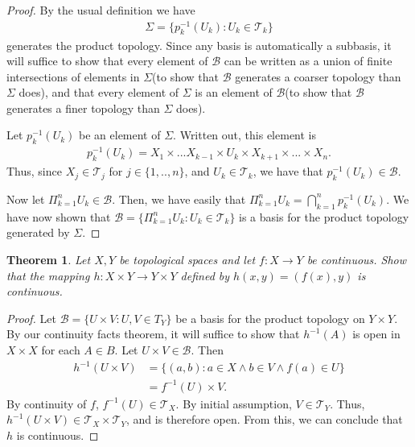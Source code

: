 \documentclass[10pt,a4paper]{article}
\theoremstyle{theorem}
\newtheorem{theorem}{Theorem}
\theoremstyle{definition}
\newcommand{\Tau}{\mathcal{T}}
\begin{document}
\begin{proof}
By the usual definition we have
\begin{align*}
\Sigma = \{p_{k}^{-1}(U_k): U_k \in \Tau_k\}
\end{align*}
generates the product topology. Since any basis is automatically a subbasis, it will suffice to show that every element of $\mathcal{B}$ can be written as a union of finite intersections of elements in $\Sigma$(to show that $\mathcal{B}$ generates a coarser topology than $\Sigma$ does),  and that every element of $\Sigma$ is an element of $\mathcal{B}$(to show that $\mathcal{B}$ generates a finer topology than $\Sigma$ does).

Let $p_{k}^{-1}(U_k)$ be an element of $\Sigma$. Written out, this element is 
\begin{align*}
p_{k}^{-1}(U_k) = X_1 \times ...  X_{k-1} \times U_k \times X_{k+1} \times ... \times X_n.
\end{align*}
Thus, since $X_j \in \Tau_j$ for $j \in \{1,..,n\}$, and $U_k \in \Tau_k$, we have that $p_{k}^{-1}(U_k) \in \mathcal{B}$.

Now let $\Pi_{k=1}^{n} U_k \in \mathcal{B}$. Then, we have easily that $\Pi_{k=1}^{n} U_k = \bigcap_{k=1}^{n} p_{k}^{-1}(U_k)$. We have now shown that $\mathcal{B} = \{\Pi_{k=1}^{n} U_k : U_k \in \Tau_k\}$ is a basis for the product topology generated by $\Sigma$.
\end{proof}

\begin{theorem}
Let $X, Y$ be topological spaces and let $f:X \to Y$ be continuous. Show that the mapping $h:X \times Y \to Y \times Y$ defined by $h(x, y) = (f(x), y)$ is continuous. 
\end{theorem}

\begin{proof}
Let $\mathcal{B} = \{U \times V : U, V \in T_Y\}$ be a basis for the product topology on $Y \times Y$. By our continuity facts theorem, it will suffice to show that $h^{-1}(A)$ is open in $X \times X$ for each $A \in B$. Let $U \times V \in \mathcal{B}$. Then
\begin{align*}
h^{-1}(U \times V) &= \{(a, b): a \in X \land b \in V \land f(a) \in U\}\\
&= f^{-1}(U) \times V.
\end{align*}
By continuity of $f$, $f^{-1}(U) \in \Tau_X$. By initial assumption, $V \in \Tau_Y$. Thus, $h^{-1}(U \times V) \in \Tau_X \times \Tau_Y$, and is therefore open.  From this, we can conclude that $h$ is continuous.
\end{proof}
\end{document}
